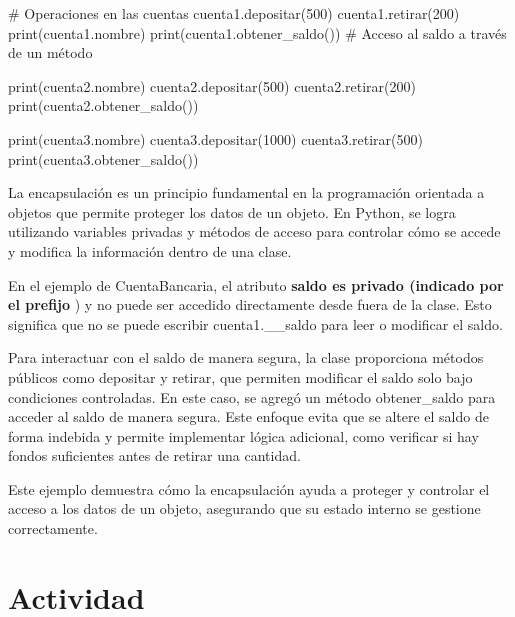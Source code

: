 \documentclass[
  a4paper,
  DIV=11,
  numbers=noendperiod,
  onepage,
  openany]{scrreprt}
\newenvironment{Shaded}{\begin{snugshade}}{\end{snugshade}}
\newcommand{\BuiltInTok}[1]{\textcolor[rgb]{0.00,0.23,0.31}{#1}}
\newcommand{\CommentTok}[1]{\textcolor[rgb]{0.37,0.37,0.37}{#1}}
\newcommand{\DecValTok}[1]{\textcolor[rgb]{0.68,0.00,0.00}{#1}}
\newcommand{\NormalTok}[1]{\textcolor[rgb]{0.00,0.23,0.31}{#1}}
\begin{document}
\begin{Shaded}
\begin{Highlighting}[]
\CommentTok{\# Operaciones en las cuentas}
\NormalTok{cuenta1.depositar(}\DecValTok{500}\NormalTok{)}
\NormalTok{cuenta1.retirar(}\DecValTok{200}\NormalTok{)}
\BuiltInTok{print}\NormalTok{(cuenta1.nombre)}
\BuiltInTok{print}\NormalTok{(cuenta1.obtener\_saldo())  }\CommentTok{\# Acceso al saldo a través de un método}

\BuiltInTok{print}\NormalTok{(cuenta2.nombre)}
\NormalTok{cuenta2.depositar(}\DecValTok{500}\NormalTok{)}
\NormalTok{cuenta2.retirar(}\DecValTok{200}\NormalTok{)}
\BuiltInTok{print}\NormalTok{(cuenta2.obtener\_saldo())}

\BuiltInTok{print}\NormalTok{(cuenta3.nombre)}
\NormalTok{cuenta3.depositar(}\DecValTok{1000}\NormalTok{)}
\NormalTok{cuenta3.retirar(}\DecValTok{500}\NormalTok{)}
\BuiltInTok{print}\NormalTok{(cuenta3.obtener\_saldo())}
\end{Highlighting}
\end{Shaded}

La encapsulación es un principio fundamental en la programación
orientada a objetos que permite proteger los datos de un objeto. En
Python, se logra utilizando variables privadas y métodos de acceso para
controlar cómo se accede y modifica la información dentro de una clase.

En el ejemplo de CuentaBancaria, el atributo \textbf{saldo es privado
(indicado por el prefijo }) y no puede ser accedido directamente desde
fuera de la clase. Esto significa que no se puede escribir
cuenta1.\_\_saldo para leer o modificar el saldo.

Para interactuar con el saldo de manera segura, la clase proporciona
métodos públicos como depositar y retirar, que permiten modificar el
saldo solo bajo condiciones controladas. En este caso, se agregó un
método obtener\_saldo para acceder al saldo de manera segura. Este
enfoque evita que se altere el saldo de forma indebida y permite
implementar lógica adicional, como verificar si hay fondos suficientes
antes de retirar una cantidad.

Este ejemplo demuestra cómo la encapsulación ayuda a proteger y
controlar el acceso a los datos de un objeto, asegurando que su estado
interno se gestione correctamente.

\section{Actividad}\label{actividad-4}
\end{document}
